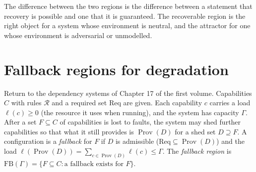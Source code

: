 The difference between the two regions is the difference between a statement that recovery is possible and one that it is guaranteed. The recoverable region is the right object for a system whose environment is neutral, and the attractor for one whose environment is adversarial or unmodelled.

\section{Fallback regions for degradation}

Return to the dependency systems of Chapter 17 of the first volume. Capabilities $C$ with rules $\mathcal R$ and a required set $\mathrm{Req}$ are given. Each capability $c$ carries a load $\ell(c)\ge0$ (the resource it uses when running), and the system has capacity $\Gamma$. After a set $F\subseteq C$ of capabilities is lost to faults, the system may shed further capabilities so that what it still provides is $\operatorname{Prov}(D)$ for a shed set $D\supseteq F$. A configuration is a \emph{fallback} for $F$ if $D$ is admissible ($\mathrm{Req}\subseteq\operatorname{Prov}(D)$) and the load $\ell(\operatorname{Prov}(D))=\sum_{c\in\operatorname{Prov}(D)}\ell(c)\le\Gamma$. The \emph{fallback region} is $\mathrm{FB}(\Gamma)=\{F\subseteq C:\text{a fallback exists for }F\}$.

